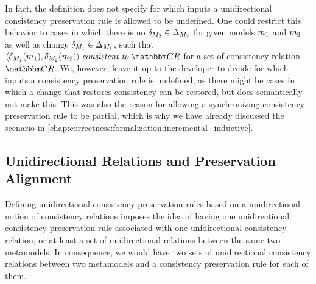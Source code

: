 In fact, the definition does not specify for which inputs a unidirectional consistency preservation rule is allowed to be undefined.
One could restrict this behavior to cases in which there is no $\delta_{M_{2}} \in \Delta_{M_{2}}$ for given models $m_{1}$ and $m_{2}$ as well as change $\delta_{M_{1}} \in \Delta_{M_{1}}$, such that $\tupled{\change{\metamodel{M}{1}}(\model{m}{1}), \change{\metamodel{M}{2}}(\model{m}{2})} \consistenttomath \consistencyrelationset{CR}$ for a set of consistency relation $\consistencyrelationset{CR}$.
We, however, leave it up to the developer to decide for which inputs a consistency preservation rule is undefined, as there might be cases in which a change that restores consistency can be restored, but does semantically not make this.
This was also the reason for allowing a synchronizing consistency preservation rule to be partial, which is why we have already discussed the scenario in \autoref{chap:correctness:formalization:incremental_inductive}.


\subsection{Unidirectional Relations and Preservation Alignment}
\label{chap:synchronization:gap:alignment}

Defining unidirectional consistency preservation rules based on a unidirectional notion of consistency relations imposes the idea of having one unidirectional consistency preservation rule associated with one unidirectional consistency relation, or at least a set of unidirectional relations between the same two metamodels.
In consequence, we would have two sets of unidirectional consistency relations between two metamodels and a consistency preservation rule for each of them.

